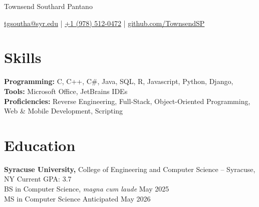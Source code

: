 
\vspace{-70pt}
\centerline{\huge Townsend Southard Pantano}

\vspace{-1pt}

\centerline{\href{mailto:tgsoutha@syr.edu}{tgsoutha@syr.edu} | \href{tel:+19785120472}{+1 (978) 512-0472} | \href{https://github.com/TownsendSP}{github.com/TownsendSP}}
\vspace{-13.5pt}
\section*{Skills}
\textbf{Programming:} C, C++, C\#, Java, SQL, R, Javascript, Python, Django, 
%
\\

\textbf{Tools:} Microsoft Office, JetBrains IDEs
%
%
\\

\textbf{Proficiencies:} Reverse Engineering, Full-Stack, Object-Oriented Programming, Web \& Mobile Development, Scripting
%
\vspace{-17pt}

\section*{Education}
\textbf{Syracuse University, } {College of Engineering and Computer Science} -- Syracuse, NY \hfill Current GPA: 3.7 \\
\hspace{2em}BS in Computer Science, \textit{magna cum laude} \hfill May 2025 \\
\hspace{2em}MS in Computer Science \hfill Anticipated May 2026 \\

\vspace{-20pt}

